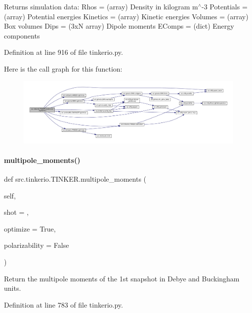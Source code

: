Returns simulation data\+: Rhos = (array) Density in kilogram m$^\wedge$-\/3 Potentials = (array) Potential energies Kinetics = (array) Kinetic energies Volumes = (array) Box volumes Dips = (3xN array) Dipole moments E\+Comps = (dict) Energy components 

Definition at line 916 of file tinkerio.\+py.

Here is the call graph for this function\+:
\nopagebreak
\begin{figure}[H]
\begin{center}
\leavevmode
\includegraphics[width=350pt]{classsrc_1_1tinkerio_1_1TINKER_a337833adac99202891b64a14bf92a7c2_cgraph}
\end{center}
\end{figure}
\mbox{\label{classsrc_1_1tinkerio_1_1TINKER_aef7b87a4751dbf7365e0615a6c9f15ee}} 
\paragraph{\texorpdfstring{multipole\+\_\+moments()}{multipole\_moments()}}
{\footnotesize\ttfamily def src.\+tinkerio.\+T\+I\+N\+K\+E\+R.\+multipole\+\_\+moments (\begin{DoxyParamCaption}\item[{}]{self,  }\item[{}]{shot = {},  }\item[{}]{optimize = {\ttfamily True},  }\item[{}]{polarizability = {\ttfamily False} }\end{DoxyParamCaption})}



Return the multipole moments of the 1st snapshot in Debye and Buckingham units. 



Definition at line 783 of file tinkerio.\+py.

